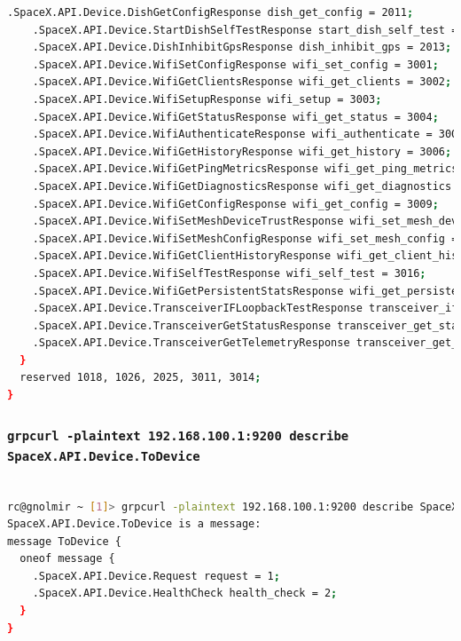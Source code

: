 \documentclass[IN,11pt,twoside,openright,bachelor,english]{tumthesis}
\begin{document}
\begin{lstlisting}[language=bash,basicstyle=\tiny]
    .SpaceX.API.Device.DishGetConfigResponse dish_get_config = 2011;
    .SpaceX.API.Device.StartDishSelfTestResponse start_dish_self_test = 2012;
    .SpaceX.API.Device.DishInhibitGpsResponse dish_inhibit_gps = 2013;
    .SpaceX.API.Device.WifiSetConfigResponse wifi_set_config = 3001;
    .SpaceX.API.Device.WifiGetClientsResponse wifi_get_clients = 3002;
    .SpaceX.API.Device.WifiSetupResponse wifi_setup = 3003;
    .SpaceX.API.Device.WifiGetStatusResponse wifi_get_status = 3004;
    .SpaceX.API.Device.WifiAuthenticateResponse wifi_authenticate = 3005;
    .SpaceX.API.Device.WifiGetHistoryResponse wifi_get_history = 3006;
    .SpaceX.API.Device.WifiGetPingMetricsResponse wifi_get_ping_metrics = 3007;
    .SpaceX.API.Device.WifiGetDiagnosticsResponse wifi_get_diagnostics = 3008;
    .SpaceX.API.Device.WifiGetConfigResponse wifi_get_config = 3009;
    .SpaceX.API.Device.WifiSetMeshDeviceTrustResponse wifi_set_mesh_device_trust = 3012;
    .SpaceX.API.Device.WifiSetMeshConfigResponse wifi_set_mesh_config = 3013 [deprecated = true];
    .SpaceX.API.Device.WifiGetClientHistoryResponse wifi_get_client_history = 3015;
    .SpaceX.API.Device.WifiSelfTestResponse wifi_self_test = 3016;
    .SpaceX.API.Device.WifiGetPersistentStatsResponse wifi_get_persistent_stats = 3022;
    .SpaceX.API.Device.TransceiverIFLoopbackTestResponse transceiver_if_loopback_test = 4001;
    .SpaceX.API.Device.TransceiverGetStatusResponse transceiver_get_status = 4003;
    .SpaceX.API.Device.TransceiverGetTelemetryResponse transceiver_get_telemetry = 4004;
  }
  reserved 1018, 1026, 2025, 3011, 3014;
}
\end{lstlisting}

\subsubsection{\texttt{grpcurl -plaintext 192.168.100.1:9200 describe SpaceX.API.Device.ToDevice}}

\begin{lstlisting}[language=bash,basicstyle=\tiny]

rc@gnolmir ~ [1]> grpcurl -plaintext 192.168.100.1:9200 describe SpaceX.API.Device.ToDevice
SpaceX.API.Device.ToDevice is a message:
message ToDevice {
  oneof message {
    .SpaceX.API.Device.Request request = 1;
    .SpaceX.API.Device.HealthCheck health_check = 2;
  }
}

\end{lstlisting}
\end{document}
